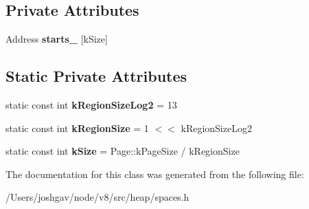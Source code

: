 \subsection*{Private Attributes}
\begin{DoxyCompactItemize}
\item 
Address {\bfseries starts\+\_\+} \mbox{[}k\+Size\mbox{]}\hypertarget{classv8_1_1internal_1_1_skip_list_a64d2a59d3fda233e1949d82f522f982c}{}\label{classv8_1_1internal_1_1_skip_list_a64d2a59d3fda233e1949d82f522f982c}

\end{DoxyCompactItemize}
\subsection*{Static Private Attributes}
\begin{DoxyCompactItemize}
\item 
static const int {\bfseries k\+Region\+Size\+Log2} = 13\hypertarget{classv8_1_1internal_1_1_skip_list_a06eb4d02e5131b1f3529b63d83956adb}{}\label{classv8_1_1internal_1_1_skip_list_a06eb4d02e5131b1f3529b63d83956adb}

\item 
static const int {\bfseries k\+Region\+Size} = 1 $<$$<$ k\+Region\+Size\+Log2\hypertarget{classv8_1_1internal_1_1_skip_list_aefb0abfd3e43c941b1d81bb0884635e1}{}\label{classv8_1_1internal_1_1_skip_list_aefb0abfd3e43c941b1d81bb0884635e1}

\item 
static const int {\bfseries k\+Size} = Page\+::k\+Page\+Size / k\+Region\+Size\hypertarget{classv8_1_1internal_1_1_skip_list_a6ad60631025864cd4c92fcad6bd1a8d3}{}\label{classv8_1_1internal_1_1_skip_list_a6ad60631025864cd4c92fcad6bd1a8d3}

\end{DoxyCompactItemize}


The documentation for this class was generated from the following file\+:\begin{DoxyCompactItemize}
\item 
/\+Users/joshgav/node/v8/src/heap/spaces.\+h\end{DoxyCompactItemize}
